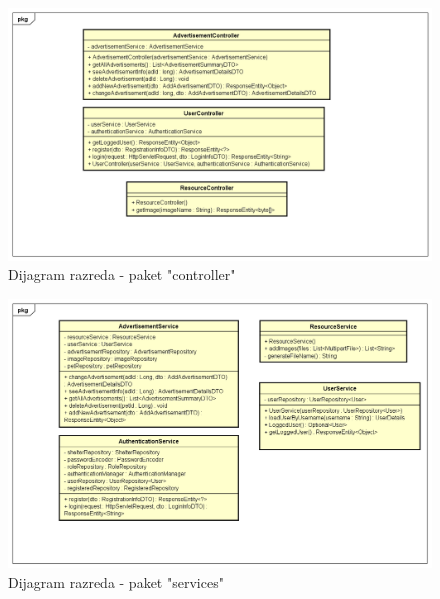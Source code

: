 			\begin{figure}[htb]
				\centering
				\includegraphics[width=\textwidth]{slike/dr1_kontroleri.png}
				\caption{Dijagram razreda - paket "controller"}
			\end{figure}
			\pagebreak
			
			\begin{figure}[htb]
				\centering
				\includegraphics[width=\textwidth]{slike/dr2_servisi.png}
				\caption{Dijagram razreda - paket "services"}
			\end{figure}
			\pagebreak
			

